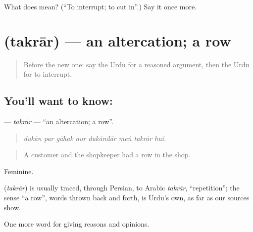 \begin{tcolorbox}[breakable,colback=teal!4,colframe=teal!35!black,title={Before you move on}]
What does  mean? (\textquotedblleft{}To interrupt; to cut in\textquotedblright{}.) Say it once more.
\end{tcolorbox}
\section[\texorpdfstring{\ur{تکرار} (takrār)}{تکرار (takrār)}]{ (takrār) — an altercation; a row}

\label{lesson:UR-C334-takrar}



\begin{quote}
Before the new one: say the Urdu for a reasoned argument, then the Urdu for to interrupt.
\end{quote}

\subsection*{You'll want to know: }
\textbf{} — \emph{takrār} — \textquotedblleft{}an altercation; a row\textquotedblright{}.

\begin{quote}
       
\end{quote}

\begin{quote}
\emph{dukān par gāhak aur dukāndār meṅ takrār huī.}
\end{quote}

\begin{quote}
A customer and the shopkeeper had a row in the shop.
\end{quote}

Feminine.

\begin{cousinweb}
\textbf{} (\emph{takrār}) is usually traced, through Persian, to Arabic \emph{takrār}, \textquotedblleft{}repetition\textquotedblright{}; the sense \textquotedblleft{}a row\textquotedblright{}, words thrown back and forth, is Urdu's own, as far as our sources show.
\end{cousinweb}

\begin{grammarlens}[title={What you've built}]
One more word for giving reasons and opinions.
\end{grammarlens}

